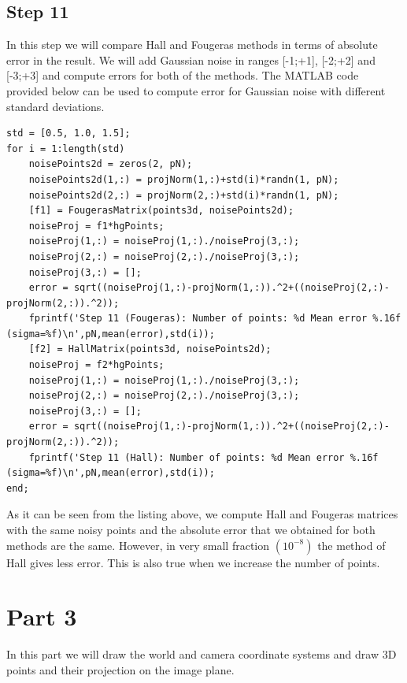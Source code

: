 \documentclass[a4paper, 10pt]{article}
\begin{document}
\subsection{Step 11}\label{step11}
In this step we will compare Hall and Fougeras methods in terms of absolute error in the result. We will add Gaussian noise in ranges [-1;+1], [-2;+2] and [-3;+3] and compute errors for both of the methods. The MATLAB code provided below can be used to compute error for Gaussian noise with different standard deviations.
\begin{lstlisting}
std = [0.5, 1.0, 1.5];
for i = 1:length(std)
    noisePoints2d = zeros(2, pN);
    noisePoints2d(1,:) = projNorm(1,:)+std(i)*randn(1, pN);
    noisePoints2d(2,:) = projNorm(2,:)+std(i)*randn(1, pN);
    [f1] = FougerasMatrix(points3d, noisePoints2d);
    noiseProj = f1*hgPoints;
    noiseProj(1,:) = noiseProj(1,:)./noiseProj(3,:);
    noiseProj(2,:) = noiseProj(2,:)./noiseProj(3,:);
    noiseProj(3,:) = [];
    error = sqrt((noiseProj(1,:)-projNorm(1,:)).^2+((noiseProj(2,:)-projNorm(2,:)).^2));
    fprintf('Step 11 (Fougeras): Number of points: %d Mean error %.16f (sigma=%f)\n',pN,mean(error),std(i));
    [f2] = HallMatrix(points3d, noisePoints2d);
    noiseProj = f2*hgPoints;
    noiseProj(1,:) = noiseProj(1,:)./noiseProj(3,:);
    noiseProj(2,:) = noiseProj(2,:)./noiseProj(3,:);
    noiseProj(3,:) = [];
    error = sqrt((noiseProj(1,:)-projNorm(1,:)).^2+((noiseProj(2,:)-projNorm(2,:)).^2));
    fprintf('Step 11 (Hall): Number of points: %d Mean error %.16f (sigma=%f)\n',pN,mean(error),std(i));
end;
\end{lstlisting}
As it can be seen from the listing above, we compute Hall and Fougeras matrices with the same noisy points and the absolute error that we obtained for both methods are the same. However, in very small fraction $(10^{-8})$ the method of Hall gives less error. This is also true when we increase the number of points.
\section{Part 3}
In this part we will draw the world and camera coordinate systems and draw 3D points and their projection on the image plane.
\end{document}
